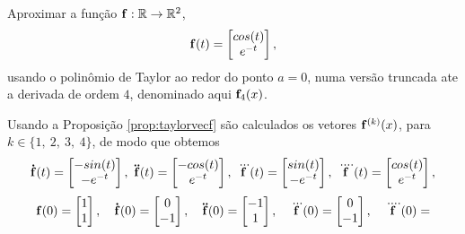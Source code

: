 \begin{example}\label{ex:prop:taylorvecf}
Aproximar a função $\VECTOR{f}:\mathbb{R} \rightarrow \mathbb{R}^{2}$,
\begin{equation}
\VECTOR{f}(t)=
\begin{bmatrix}
cos(t)\\
e^{-t}
\end{bmatrix},
\end{equation}
usando o polinômio de Taylor ao redor do ponto $a=0$,
numa versão truncada ate a derivada de ordem $4$,
denominado aqui $\VECTOR{f}_4(x)$.
\end{example}
\begin{SolutionT}
Usando a Proposição \ref{prop:taylorvecf} são calculados os vetores $\VECTOR{f}^{(k)}(x)$, para $k\in\{1,~ 2,~ 3,~ 4\}$,
de modo que obtemos
\begin{equation}
\DTVECTOR{f}(t)=
\begin{bmatrix}
-sin(t)\\
-e^{-t}
\end{bmatrix},~
\DDTVECTOR{f}(t)=
\begin{bmatrix}
-cos(t)\\
e^{-t}
\end{bmatrix},~
\DDDTVECTOR{f}(t)=
\begin{bmatrix}
sin(t)\\
-e^{-t}
\end{bmatrix},~
\DDDDTVECTOR{f}(t)=
\begin{bmatrix}
cos(t)\\
e^{-t}
\end{bmatrix},
\end{equation}
\begin{equation}
\VECTOR{f}(0)=
\begin{bmatrix}
1\\
1
\end{bmatrix},
\quad
\DTVECTOR{f}(0)=
\begin{bmatrix}
0\\
-1
\end{bmatrix},
\quad
\DDTVECTOR{f}(0)=
\begin{bmatrix}
-1\\
1
\end{bmatrix},
\quad
\DDDTVECTOR{f}(0)=
\begin{bmatrix}
0\\
-1
\end{bmatrix},
\quad
\DDDDTVECTOR{f}(0)=

\end{equation}
\end{SolutionT}
